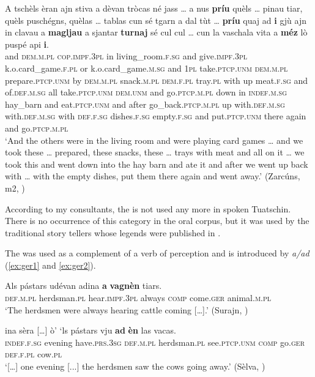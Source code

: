 \ea\label{ex:omit:1}
\gll    A tschèls èran ajn stiva a dèvan tròcas né jass … a nus \textbf{príu} quèls … pinau tiar, quèls puschégns, quèlas … tablas cun sé tgarn a dal tùt … \textbf{príu} quaj ad \textbf{i} gjù ajn in clavau a \textbf{magljau} a sjantar \textbf{turnaj} sé cul cul … cun la vaschala vita a \textbf{méz} lò puspé api \textbf{i}.\\
and \textsc{dem.m.pl} \textsc{cop.impf.3pl} in living\_room.\textsc{f.sg} and give.\textsc{impf.3pl} k.o.card\_game.\textsc{f.pl} or k.o.card\_game.\textsc{m.sg} {} and \textsc{1pl} take.\textsc{ptcp.unm} \textsc{dem.m.pl} {} prepare.\textsc{ptcp.unm} by \textsc{dem.m.pl} snack.\textsc{m.pl}  \textsc{dem.f.pl} {} tray.\textsc{pl} with up meat.\textsc{f.sg} and of.\textsc{def.m.sg} all {} take.\textsc{ptcp.unm} \textsc{dem.unm} and go.\textsc{ptcp.m.pl} down in \textsc{indef.m.sg} hay\_barn and eat.\textsc{ptcp.unm} and after go\_back.\textsc{ptcp.m.pl} up with.\textsc{def.m.sg} with.\textsc{def.m.sg} {} with \textsc{def.f.sg} dishes.\textsc{f.sg} empty.\textsc{f.sg} and put.\textsc{ptcp.unm} there again and go.\textsc{ptcp.m.pl}\\
\glt `And the others were in the living room and were playing card games … and we took these … prepared, these snacks, these … trays with meat and all on it … we took this and went down into the hay barn and ate it and after we went up back with … with the empty dishes, put them there again and went away.' (Zarcúns, m2, )
\z

\label{sec:4.1.2.1.2}

According to my consultants, the  is not used any more in spoken Tuatschin. There is no occurrence of this category in the oral corpus, but it was used by the traditional story tellers whose legends were published in \citet{Büchli1966}.

The  was used as a complement of a verb of perception and is introduced by \textit{a/ad} (\ref{ex:ger1} and \ref{ex:ger2}).

\ea\label{ex:ger1}
\gll    Als pástars udévan adina \textbf{a} \textbf{vagnèn} tiars.\\
   \textsc{def.m.pl} herdsman.\textsc{pl} hear.\textsc{impf.3pl} always \textsc{comp} come.\textsc{ger}  animal.\textsc{m.pl}\\
\glt `The herdsmen were always hearing cattle coming […].' (Surajn, \citealt[53]{Büchli1966})
\z

\ea\label{ex:ger2}
\gll   [...] ina sèra […] ò’ ‘ls pástars vju \textbf{ad} \textbf{èn} las vacas.\\
{} \textsc{indef.f.sg} evening {} have.\textsc{prs.3sg} \textsc{def.m.pl} herdsman.\textsc{pl} see.\textsc{ptcp.unm} \textsc{comp} go.\textsc{ger} \textsc{def.f.pl} cow.\textsc{pl} \\
\glt `[…] one evening [...] the herdsmen saw the cows going away.' (Sèlva, \citealt[28]{Büchli1966})
\z

